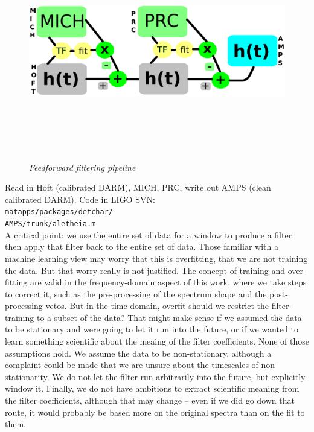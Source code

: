 \begin{figure}
\includegraphics[height=95mm,width=120mm]{pipeline.eps}
\caption{\textit{Feedforward filtering pipeline}}
\label{pipeline}
\end{figure}    
\textup{Read in Hoft (calibrated DARM), MICH, PRC,
write out AMPS (clean calibrated DARM). Code in LIGO SVN:}\\
\texttt{matapps/packages/detchar/} \\ 
\texttt{AMPS/trunk/aletheia.m}
\\


        A critical point: we use the entire set of data for a window to produce a filter, then apply that filter back to the entire set of data. Those familiar with a machine learning view may worry that this is overfitting, that we are not training the data. But that worry really is not justified. The concept of training and over-fitting are valid in the frequency-domain aspect of this work, where we take steps to correct it, such as the pre-processing of the spectrum shape and the post-processing vetos. But in the time-domain, overfit should we restrict the filter-training to a subset of the data? That might make sense if we assumed the data to be stationary and were going to let it run into the future, or if we wanted to learn something scientific about the meaing of the filter coefficients. None of those assumptions hold. We assume the data to be non-stationary, although a complaint could be made that we are unsure about the timescales of non-stationarity. We do not let the filter run arbitrarily into the future, but explicitly window it. Finally, we do not have ambitions to extract scientific meaning from the filter coefficients, although that may change -- even if we did go down that route, it would probably be based more on the original spectra than on the fit to them.

